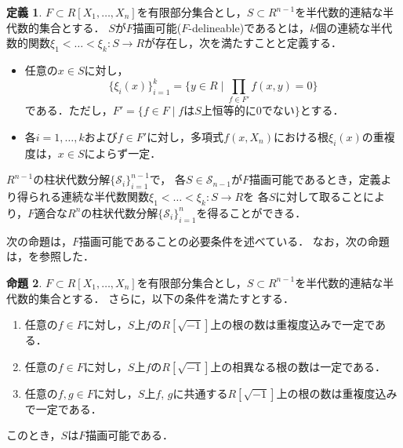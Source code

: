 \documentclass[uplatex, dvipdfmx]{jsarticle}
\numberwithin{equation}{section}
\newcommand{\calS}{\mathcal{S}}
\newcommand{\map}[3]{{#1}\colon{#2}\rightarrow{#3}}
\theoremstyle{definition}
\newtheorem{definition}{定義}[section]
\newtheorem{proposition}[definition]{命題}
\begin{document}
\begin{definition} 
     $F \subset R[X_1, \dots, X_n]$を有限部分集合とし，$S \subset R^{n-1}$を半代数的連結な半代数的集合とする．
     $S$が$F$描画可能($F$-delineable)であるとは，$k$個の連続な半代数的関数$\map{\xi_1<\dots<\xi_k}{S}{R}$が存在し，次を満たすことと定義する．
     \begin{itemize}
          \item 任意の$ x \in S $に対し，
          \begin{equation}
               \{\xi_i(x)\}_{i=1}^k = \{y \in R \mid \prod_{f \in F'}f(x,y)=0\}
          \end{equation}
          である．ただし，$F' = \{f \in F \mid \text{$f$は$S$上恒等的に$0$でない}\}$とする．
          \item 各$i=1, \dots, k$および$f \in F'$に対し，多項式$f(x,X_n)$における根$\xi_i(x)$の重複度は，$x\in S$によらず一定．
     \end{itemize}
\end{definition}

$R^{n-1}$の柱状代数分解$\{\calS_i\}_{i=1}^{n-1}$で，
各$S \in \calS_{n-1}$が$F$描画可能であるとき，定義より得られる連続な半代数関数$\map{\xi_1<\dots<\xi_k}{S}{R}$を
各$S$に対して取ることにより，$F$適合な$R^n$の柱状代数分解$\{\calS_i\}_{i=1}^n$を得ることができる．

次の命題は，$F$描画可能であることの必要条件を述べている．
なお，次の命題は，\cite[Proposition 5.14.]{MR2248869}を参照した．

\begin{proposition}\label{proposition:del}
     $F \subset R[X_1, \dots, X_n]$を有限部分集合とし，$S \subset R^{n-1}$を半代数的連結な半代数的集合とする．
     さらに，以下の条件を満たすとする．
     \begin{enumerate}
          \item \label{proposition:del-1}
          任意の$f \in F$に対し，$S$上$f$の$R[\sqrt{-1}]$上の根の数は重複度込みで一定である．
          \item \label{proposition:del-2}
          任意の$f \in F$に対し，$S$上$f$の$R[\sqrt{-1}]$上の相異なる根の数は一定である．
          \item \label{proposition:del-3}
          任意の$f, g \in F$に対し，$S$上$f$, $g$に共通する$R[\sqrt{-1}]$上の根の数は重複度込みで一定である．
     \end{enumerate}
     このとき，$S$は$F$描画可能である．
\end{proposition}
\end{document}
